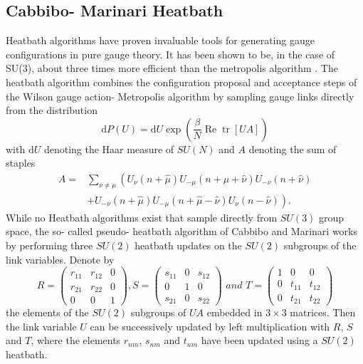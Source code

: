 \documentclass[a4paper,10pt]{book}
\begin{document}
\subsection{Cabbibo- Marinari Heatbath}
Heatbath algorithms have proven invaluable tools for generating gauge configurations in pure gauge theory. It has been shown to be, in the case of SU(3), about three times more efficient than the metropolis algorithm \cite{CABIBBO1982387}. The heatbath algorithm combines the configuration proposal and acceptance steps of the Wilson gauge action- Metropolis algorithm by sampling gauge links directly from the distribution
\begin{equation}\label{eq:Heatbath_distribution}
\mathrm{d} P(U)=\mathrm{d} U \exp \left(\frac{\beta}{N} \operatorname{Re} \operatorname{tr}[U A]\right)
\end{equation}
with $\mathrm{d} U$ denoting the Haar measure of $SU(N)$ and $A$ denoting the sum of staples 
\begin{equation}
\begin{aligned}
A=&\sum_{\nu \neq \mu}\left(U_{\nu}(n+\hat{\mu}) U_{-\mu}(n+\hat{\mu}+\hat{\nu}) U_{-\nu}(n+\hat{\nu})\right.\\
&\left.+U_{-\nu}(n+\hat{\mu}) U_{-\mu}(n+\hat{\mu}-\hat{\nu}) U_{\nu}(n-\hat{\nu})\right).
\end{aligned}
\end{equation}
While no Heatbath algorithms exist that sample directly from $SU(3)$ group space, the so- called pseudo- heatbath algorithm of Cabbibo and Marinari \cite{CABIBBO1982387} works by performing three $SU(2)$ heatbath updates on the $SU(2)$ subgroups of the link variables. Denote by 
\begin{equation}\label{eq:SU2_embeddingInSU3}
R=\left(\begin{array}{ccc}
r_{11} & r_{12} & 0 \\
r_{21} & r_{22} & 0 \\
0 & 0 & 1
\end{array}\right), S=\left(\begin{array}{ccc}
s_{11} & 0 & s_{12} \\
0 & 1 & 0 \\
s_{21} & 0 & s_{22}
\end{array}\right)\,\, and\,\, T=\left(\begin{array}{ccc}
1 & 0 & 0 \\
0 & t_{11} & t_{12} \\
0 & t_{21} & t_{22}
\end{array}\right)
\end{equation}
the elements of the $SU(2)$ subgroups of $UA$ embedded in $3\times3$ matrices. Then the link variable $U$ can be successively updated by left multiplication with $R$, $S$ and $T$, where the elements $r_{nm}$, $s_{nm}$ and $t_{nm}$ have been updated using a $SU(2)$ heatbath.
\end{document}
